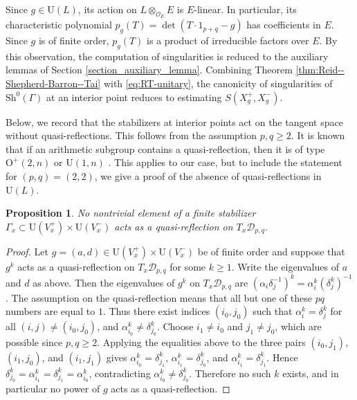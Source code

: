 \documentclass[11pt]{amsart}
\theoremstyle{plain}
\newtheorem{prop}[thm]{Proposition}
\theoremstyle{definition}
\numberwithin{equation}{section}
\def\det{\mathop{\mathrm{det}}\nolimits}
\def\OO{\mathscr{O}}
\def\U{\mathrm{U}}
\def\O{\mathrm{O}}
\begin{document}
Since $g\in \U(L)$, its action on $L\otimes_{\OO_E}E$ is $E$-linear. In particular, its characteristic polynomial $p_g(T) = \det(T \cdot 1_{p+q} - g)$ has coefficients in $E$.
Since $g$ is of finite order, $p_g(T)$ is a product of irreducible factors over $E$.
By this observation, the computation of singularities is reduced to the auxiliary lemmas of Section \ref{section_auxiliary_lemma}.
Combining Theorem \ref{thm:Reid--Shepherd-Barron--Tai} with \eqref{eq:RT-unitary}, the canonicity of
singularities of $\mathrm{Sh}^0(\Gamma)$ at an interior point reduces to estimating $S(X_g^+,X_g^-)$.


Below, we record that the stabilizers at
interior points act on the tangent space without quasi-reflections.
This follows from the assumption $p,q\geq2$.
It is known that if an arithmetic subgroup contains a quasi-reflection, then it is of type $\O^+(2,n)$ or $\U(1,n)$ \cite{meschiari1972reflections}.
This applies to our case, but to include the statement for $(p,q) = (2,2)$, we give a proof of the absence of quasi-reflections in $\U(L)$.

\begin{prop}\label{prop:no-qref}
  No nontrivial element of a finite stabilizer $\Gamma_x\subset \U(V_{x}^+)\times \U(V_{x}^-)$
  acts as a quasi-reflection on $T_x\mathcal{D}_{p,q}$.
\end{prop}

\begin{proof}
  Let $g=(a,d)\in \U(V_{x}^+)\times \U(V_{x}^-)$ be of finite order and suppose that $g^k$ acts as a quasi-reflection
  on $T_x\mathcal{D}_{p,q}$ for some $k\ge 1$.  Write the eigenvalues of $a$ and $d$ as above.
  Then the eigenvalues of $g^k$ on $T_x\mathcal{D}_{p,q}$ are $(\alpha_i\delta_j^{-1})^k=\alpha_i^{k}(\delta_j^{k})^{-1}$.
  The assumption on the quasi-reflection means that all but one of these $pq$ numbers are equal to $1$.
  Thus there exist indices $(i_0,j_0)$ such that $\alpha_i^{k}=\delta_j^{k}$ for all $(i,j)\neq(i_0,j_0)$, and
    $\alpha_{i_0}^{k}\neq \delta_{j_0}^{k}$.
  Choose $i_1\neq i_0$ and $j_1\neq j_0$, which are possible since $p,q\ge 2$.
  Applying the equalities above to the three pairs $(i_0,j_1)$, $(i_1,j_0)$, and $(i_1,j_1)$ gives
    $\alpha_{i_0}^{k}=\delta_{j_1}^{k}$,
    $\alpha_{i_1}^{k}=\delta_{j_0}^{k}$, and 
    $\alpha_{i_1}^{k}=\delta_{j_1}^{k}$.
  Hence $\delta_{j_0}^{k}=\alpha_{i_1}^{k}=\delta_{j_1}^{k}=\alpha_{i_0}^{k}$, contradicting
  $\alpha_{i_0}^{k}\ne\delta_{j_0}^{k}$.
  Therefore no such $k$ exists, and in particular no power of $g$ acts as a quasi-reflection.
\end{proof}
\end{document}
